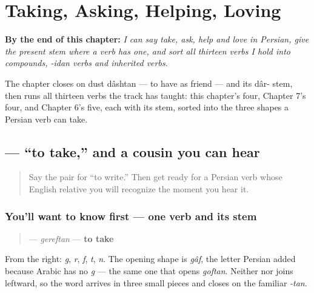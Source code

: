 
\chapter{Taking, Asking, Helping, Loving}
\label{ch:fa-doing-verbs}

\begin{chapteropening}
\textbf{By the end of this chapter:} \emph{I can say take, ask, help and love in Persian, give the present stem where a verb has one, and sort all thirteen verbs I hold into compounds, -idan verbs and inherited verbs.}

The chapter closes on dust dâshtan — to have as friend — and its dâr- stem, then runs all thirteen verbs the track has taught: this chapter's four, Chapter 7's four, and Chapter 6's five, each with its stem, sorted into the three shapes a Persian verb can take.
\end{chapteropening}

\section[\texorpdfstring{\fa{گرفتن} (gereftan)}{گرفتن (gereftan)}]{ — “to take,” and a cousin you can hear}

\label{lesson:FA-C08-gereftan}



\begin{quote}
Say the pair for “to write.” Then get ready for a Persian verb whose English relative you will recognize the moment you hear it.
\end{quote}

\subsection*{You'll want to know first — one verb and its stem}
\begin{quote}
\textbf{} — \emph{gereftan} — \textbf{to take}
\end{quote}

From the right: \textbf{} \emph{g}, \textbf{} \emph{r}, \textbf{} \emph{f}, \textbf{} \emph{t}, \textbf{} \emph{n}. The opening shape is \textbf{} \emph{gâf}, the letter Persian added because Arabic has no \emph{g} — the same one that opens \textbf{} \emph{goftan}. Neither \textbf{} nor \textbf{} joins leftward, so the word arrives in three small pieces and closes on the familiar \emph{-tan}.

